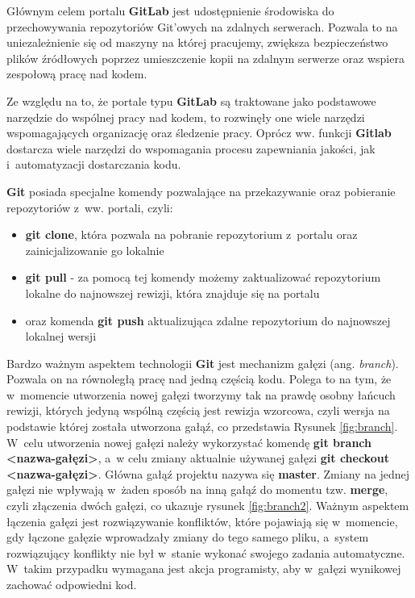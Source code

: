 Głównym celem portalu \textbf{GitLab} jest udostępnienie środowiska do przechowywania repozytoriów Git'owych na zdalnych serwerach. Pozwala to na uniezależnienie się od maszyny na której pracujemy, zwiększa bezpieczeństwo plików źródłowych poprzez umieszczenie kopii na zdalnym serwerze oraz wspiera zespołową pracę nad kodem.\par

Ze względu na to, że portale typu \textbf{GitLab} są traktowane jako podstawowe narzędzie do wspólnej pracy nad kodem, to rozwinęły one wiele narzędzi wspomagających organizację oraz śledzenie pracy. Oprócz ww. funkcji \textbf{Gitlab} dostarcza wiele narzędzi do wspomagania procesu zapewniania jakości, jak i~automatyzacji dostarczania kodu.\par

\textbf{Git} posiada specjalne komendy pozwalające na przekazywanie oraz pobieranie repozytoriów z~ww. portali, czyli:
\begin{itemize}
\item \textbf{git clone}, która pozwala na pobranie repozytorium z~portalu oraz zainicjalizowanie go lokalnie
\item \textbf{git pull} - za pomocą tej komendy możemy zaktualizować repozytorium lokalne do najnowszej rewizji, która znajduje się na portalu
\item oraz komenda \textbf{git push} aktualizująca zdalne repozytorium do najnowszej lokalnej wersji
\end{itemize}

Bardzo ważnym aspektem technologii \textbf{Git} jest mechanizm gałęzi (ang. \textit{branch}). Pozwala on na równoległą pracę nad jedną częścią kodu. Polega to na tym, że w~momencie utworzenia nowej gałęzi tworzymy tak na prawdę osobny łańcuch rewizji, których jedyną wspólną częścią jest rewizja wzorcowa, czyli wersja na podstawie której została utworzona gałąź, co przedstawia Rysunek \ref{fig:branch}. W~celu utworzenia nowej gałęzi należy wykorzystać komendę \textbf{git branch <nazwa-gałęzi>}, a~w celu zmiany aktualnie używanej gałęzi \textbf{git checkout <nazwa-gałęzi>}. Główna gałąź projektu nazywa się \textbf{master}. Zmiany na jednej gałęzi nie wpływają w~żaden sposób na inną gałąź do momentu tzw. \textbf{merge}, czyli złączenia dwóch gałęzi, co ukazuje rysunek \ref{fig:branch2}. Ważnym aspektem łączenia gałęzi jest rozwiązywanie konfliktów, które pojawiają się w~momencie, gdy łączone gałęzie wprowadzały zmiany do tego samego pliku, a~system rozwiązujący konflikty nie był w~stanie wykonać swojego zadania automatyczne. W~takim przypadku wymagana jest akcja programisty, aby w~gałęzi wynikowej zachować odpowiedni kod.


